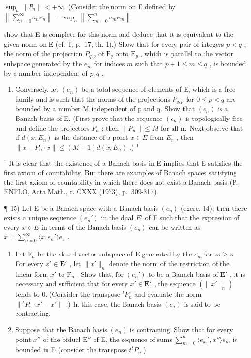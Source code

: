 \(\sup_{n}\| P_{n}\| < + \infty .\) (Consider the norm on E defined by \(\left\| \sum_{n = 0}^{\infty}a_n e_n\right\| = \sup_{n}\left\| \sum_{m = 0}^{n}a_me_m\right\|\)

show that E is complete for this norm and deduce that it is equivalent to the given norm on E (cf.~I, p.~17, th. 1).) Show that for every pair of integers \(p < q\) , the norm of the projection \(P_{q,p}\) of \(\mathrm{E}_q\) onto \(\mathrm{E}_p\) , which is parallel to the vector subspace generated by the \(e_m\) for indices \(m\) such that \(p + 1 \leqslant m \leqslant q\) , is bounded by a number independent of \(p, q\) .

\begin{enumerate}
\def\labelenumi{\alph{enumi})}
\setcounter{enumi}{1}
\tightlist
\item
  Conversely, let \((e_{n})\) be a total sequence of elements of E, which is a free family and is such that the norms of the projections \(P_{q,p}\) for \(0 \leqslant p < q\) are bounded by a number M independent of p and q. Show that \((e_{n})\) is a Banach basis of E. (First prove that the sequence \((e_{n})\) is topologically free and define the projectors \(P_{n}\) ; then \(\|P_{n}\| \leqslant M\) for all n.~Next observe that if \(d(x, E_{n})\) is the distance of a point \(x \in E\) from \(E_{n}\) , then \(\|x - P_{n} \cdot x\| \leqslant (M + 1) d(x, E_{n})\) .) \(^{1}\)
\end{enumerate}

\(^{1}\) It is clear that the existence of a Banach basis in E implies that E satisfies the first axiom of countability. But there are examples of Banach spaces satisfying the first axiom of countability in which there does not exist a Banach basis (P. ENFLO, Acta Math., t. CXXX (1973), p.~309-317).

¶ 15) Let E be a Banach space with a Banach basis \((e_n)\) (exerc. 14); then there exists a unique sequence \((e_n')\) in the dual \(E'\) of E such that the expression of every \(x \in E\) in terms of the Banach basis \((e_n)\) can be written as \(x = \sum_{n=0}^{\infty} \langle x, e_n' \rangle e_n\) .

\begin{enumerate}
\def\labelenumi{\alph{enumi})}
\item
  Let \(\mathrm{F}_n\) be the closed vector subspace of \(\mathbf{E}\) generated by the \(e_m\) for \(m \geqslant n\) . For every \(x' \in \mathbf{E}'\) , let \(\| x' \|_n\) denote the norm of the restriction of the linear form \(x'\) to \(\mathrm{F}_n\) . Show that, for \((e_n')\) to be a Banach basis of \(\mathbf{E}'\) , it is necessary and sufficient that for every \(x' \in \mathbf{E}'\) , the sequence \((\| x' \|_n)\) tends to 0. (Consider the transpose \({}^t P_n\) and evaluate the norm \(\| {}^t P_n \cdot x' - x' \|\) .) In this case, the Banach basis \((e_n)\) is said to be contracting.
\item
  Suppose that the Banach basis \((e_n)\) is contracting. Show that for every point \(x''\) of the bidual \(\mathrm{E}''\) of E, the sequence of sums \(\sum_{m=0}^{n} \langle e_m', x'' \rangle e_m\) is bounded in E (consider the transpose \(t^t P_n\) )
\end{enumerate}

